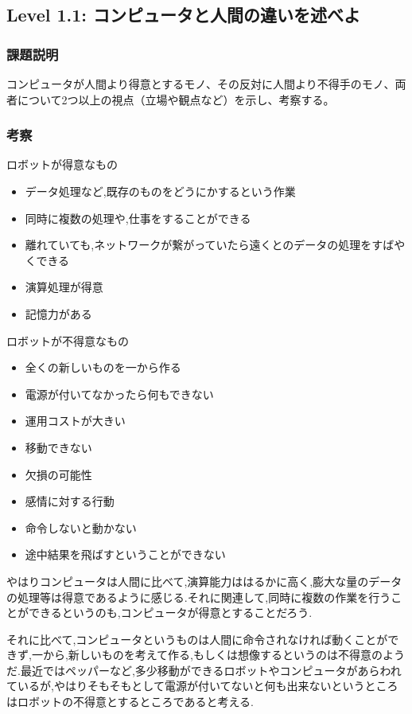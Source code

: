 \subsection{Level 1.1: コンピュータと人間の違いを述べよ}
\subsubsection{課題説明}
コンピュータが人間より得意とするモノ、その反対に人間より不得手のモノ、両者について2つ以上の視点（立場や観点など）を示し、考察する。

\subsubsection{考察}
ロボットが得意なもの
\begin{itemize}
 \item データ処理など,既存のものをどうにかするという作業 \\
 \item 同時に複数の処理や,仕事をすることができる \\
 \item 離れていても,ネットワークが繋がっていたら遠くとのデータの処理をすばやくできる\\
 \item 演算処理が得意 \\
 \item 記憶力がある \\
\end{itemize}
ロボットが不得意なもの
\begin{itemize}
\item 全くの新しいものを一から作る\\
\item 電源が付いてなかったら何もできない \\
\item 運用コストが大きい \\
\item 移動できない \\
\item 欠損の可能性 \\

\item 感情に対する行動 \\
\item 命令しないと動かない \\
\item 途中結果を飛ばすということができない \\
\end{itemize}

やはりコンピュータは人間に比べて,演算能力ははるかに高く,膨大な量のデータの処理等は得意であるように感じる.それに関連して,同時に複数の作業を行うことができるというのも,コンピュータが得意とすることだろう.

それに比べて,コンピュータというものは人間に命令されなければ動くことができず,一から,新しいものを考えて作る,もしくは想像するというのは不得意のようだ.最近ではペッパーなど,多少移動ができるロボットやコンピュータがあらわれているが,やはりそもそもとして電源が付いてないと何も出来ないというところはロボットの不得意とするところであると考える.